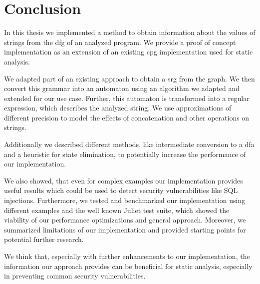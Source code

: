 \chapter{Conclusion}\label{chapter:Conclusion}

In this thesis we implemented a method to obtain information about the values of strings from the \acl{dfg} of an analyzed program. We provide a proof of concept implementation as an extension of an existing \acl{cpg} implementation used for static analysis.

We adapted part of an existing approach to obtain a \acl{srg} from the graph. We then convert this grammar into an automaton using an algorithm we adapted and extended for our use case.
Further, this automaton is transformed into a regular expression, which describes the analyzed string. We use approximations of different precision to model the effects of concatenation and other operations on strings.

Additionally we described different methods, like intermediate conversion to a \ac{dfa} and a heuristic for state elimination, to potentially increase the performance of our implementation.

We also showed, that even for complex examples our implementation provides useful results which could be used to detect security vulnerabilities like SQL injections.
Furthermore, we tested and benchmarked our implementation using different examples and the well known Juliet test suite, which showed the viability of our performance optimizations and general approach.
Moreover, we summarized limitations of our implementation and provided starting points for potential further research.

We think that, especially with further enhancements to our implementation, the information our approach provides can be beneficial for static analysis, especially in preventing common security vulnerabilities.

\begin{comment}	
Summarize your main contributions and observations. Further research directions?

$\leq 1$ page
content...
\end{comment}
